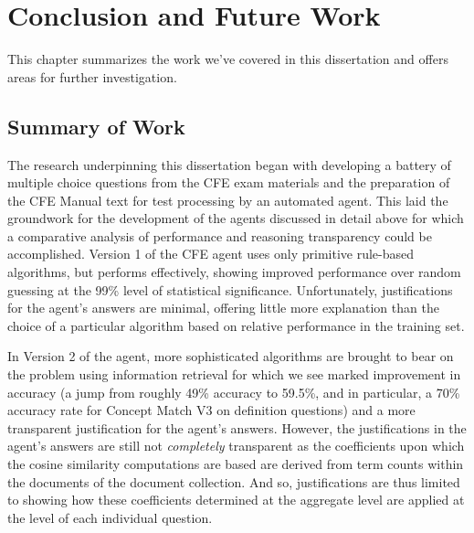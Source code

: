  

\chapter{Conclusion and Future Work}

This chapter summarizes the work we’ve covered in this dissertation and offers areas for further investigation.

\section{Summary of Work}

The research underpinning this dissertation began with developing a battery of multiple choice questions from the CFE exam materials and the preparation of the CFE Manual text for test processing by an automated agent. This laid the groundwork for the development of the agents discussed in detail above for which a comparative analysis of performance and reasoning transparency could be accomplished.  Version 1 of the CFE agent uses only primitive rule-based algorithms, but performs effectively, showing improved performance over random guessing at the 99\% level of statistical significance.  Unfortunately, justifications for the agent’s answers are minimal, offering little more explanation than the choice of a particular algorithm based on relative performance in the training set.  

In Version 2 of the agent, more sophisticated algorithms are brought to bear on the problem using information retrieval for which we see marked improvement in accuracy (a jump from roughly 49\% accuracy to 59.5\%, and in particular, a 70\% accuracy rate for Concept Match V3 on definition questions) and a more transparent justification for the agent’s answers. However, the justifications in the agent's answers are still not \emph{completely} transparent as the coefficients upon which the cosine similarity computations are based are derived from term counts within the documents of the document collection. And so, justifications are thus limited to showing how these coefficients determined at the aggregate level are applied at the level of each individual question.


